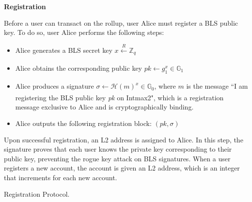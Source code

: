 \begin{Protocol*}[h]
\begin{mdframed}

\fontsize{10pt}{2cm}


\begin{center}
    \textbf{Registration}
\end{center}

\smallbreak

Before a user can transact on the rollup, user Alice must register a BLS public key. To do so, user Alice performs the following steps:

\begin{itemize}
  \setlength\itemsep{0.25em}

    \item Alice generates a BLS secret key $x \xleftarrow[]{R} \mathbb{Z}_{q}$
    
    \item Alice obtains the corresponding public key $pk \xleftarrow[]{} g_{1}^{x} \in \mathbb{G}_{1}$

    \item Alice produces a signature $\sigma \xleftarrow[]{}\mathcal{H}(m)^{x} \in \mathbb{G}_{0}$, where \(m\) is the message ``I am registering the BLS public key \emph{pk} on Intmax2", which is a registration message exclusive to Alice and is cryptographically binding.

    \item Alice outputs the following registration block: $(pk, \sigma)$

\end{itemize}

Upon successful registration, an L2 address is assigned to Alice.
\smallbreak
In this step, the signature proves that each user knows the private key corresponding to their public key, preventing the rogue key attack on BLS signatures. When a user registers a new account, the account is given an L2 address, which is an integer that increments for each new account.


\normalsize	
\end{mdframed}
\caption{Registration Protocol.
\label{alg:reg}}
\end{Protocol*}